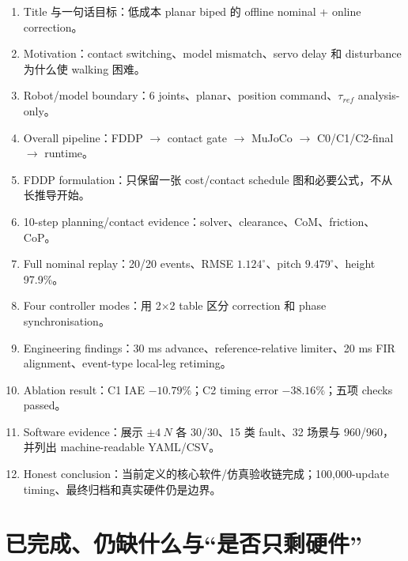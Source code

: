 \documentclass[UTF8,11pt,a4paper]{ctexart}
\begin{document}
\begin{enumerate}
 \item Title 与一句话目标：低成本 planar biped 的 offline nominal + online correction。
 \item Motivation：contact switching、model mismatch、servo delay 和 disturbance 为什么使 walking 困难。
 \item Robot/model boundary：6 joints、planar、position command、$\tau_{ref}$ analysis-only。
 \item Overall pipeline：FDDP $\rightarrow$ contact gate $\rightarrow$ MuJoCo $\rightarrow$ C0/C1/C2-final $\rightarrow$ runtime。
 \item FDDP formulation：只保留一张 cost/contact schedule 图和必要公式，不从长推导开始。
 \item 10-step planning/contact evidence：solver、clearance、CoM、friction、CoP。
 \item Full nominal replay：20/20 events、RMSE $1.124^\circ$、pitch $9.479^\circ$、height 97.9\%。
 \item Four controller modes：用 2$\times$2 table 区分 correction 和 phase synchronisation。
 \item Engineering findings：30 ms advance、reference-relative limiter、20 ms FIR alignment、event-type local-leg retiming。
 \item Ablation result：C1 IAE $-10.79\%$；C2 timing error $-38.16\%$；五项 checks passed。
 \item Software evidence：展示 $\pm\SI{4}{N}$ 各 30/30、15 类 fault、32 场景与 960/960，并列出 machine-readable YAML/CSV。
 \item Honest conclusion：当前定义的核心软件/仿真验收链完成；100,000-update timing、最终归档和真实硬件仍是边界。
\end{enumerate}

\section{已完成、仍缺什么与“是否只剩硬件”}\label{sec:gaps}
\end{document}
